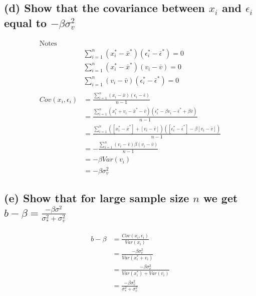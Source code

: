 \documentclass[12pt, a4paper]{article}
\begin{document}
\subsection*{(d) Show that the covariance between $x_i$ and $\epsilon_i$ equal to $-\beta\sigma_v^2$}
\begin{align*}
    \text{Notes}\\
    &\sum_{i=1}^n(x_i^*-\bar{x}^*)(\epsilon_i^*-\bar{\epsilon}^*)=0\\
    &\sum_{i=1}^n(x_i^*-\bar{x}^*)(v_i -\bar{v})=0\\
    &\sum_{i=1}^n(v_i -\bar{v})(\epsilon_i^*-\bar{\epsilon}^*)=0\\\\
    Cov(x_i, \epsilon_i)&= \frac{\sum_{i=1}^n(x_i-\bar{x})(\epsilon_i-\bar{\epsilon})}{n-1}\\
    &= \frac{\sum_{i=1}^n(x_i^*+v_i-\bar{x}^* - \bar{v})(\epsilon_i^*-\beta v_i-\bar{\epsilon}^* + \beta \bar{v})}{n-1}\\
    &= \frac{\sum_{i=1}^n([x_i^*-\bar{x}^*] + [v_i -\bar{v}])([\epsilon_i^*-\bar{\epsilon}^*]- \beta[v_i -\bar{v}])}{n-1}\\
    &= -\frac{\sum_{i=1}^n(v_i -\bar{v})\beta(v_i -\bar{v})}{n-1}\\
    &= -\beta Var(v_i)\\
    &= -\beta \sigma_v^2
\end{align*}
\vspace{1em}

\subsection*{(e) Show that for large sample size $n$ we get $b - \beta = \frac{-\beta \sigma^2}{\sigma_*^2+\sigma_v^2}$}
\begin{align*}
    b - \beta &= \frac{Cov(x_i, \epsilon_i)}{Var(x_i)}\\
    &= \frac{-\beta \sigma_v^2}{Var(x_i^*+v_i)}\\
    &= \frac{-\beta \sigma_v^2}{Var(x_i^*)+Var(v_i)}\\
    &= \frac{-\beta \sigma_v^2}{\sigma_*^2+\sigma_v^2}
\end{align*}
\vspace{1em}
\end{document}
